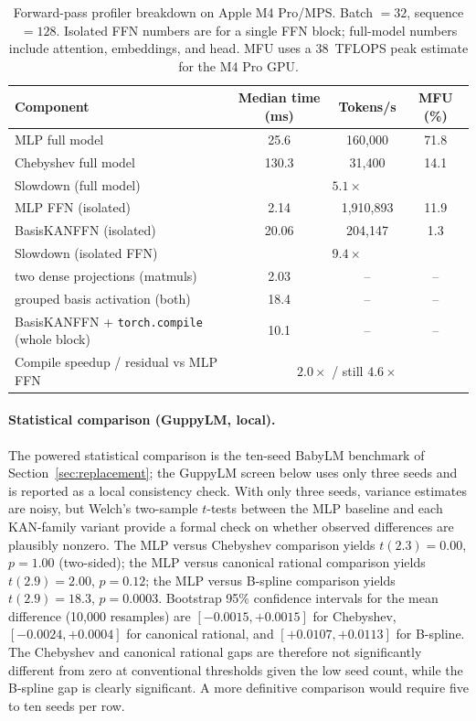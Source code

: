 \documentclass[11pt]{article}
\begin{document}
\begin{table}[t]
\centering
\caption{Forward-pass profiler breakdown on Apple M4 Pro/MPS. Batch \(=32\), sequence \(=128\). Isolated FFN numbers are for a single FFN block; full-model numbers include attention, embeddings, and head. MFU uses a \(38\)~TFLOPS peak estimate for the M4 Pro GPU.}
\label{tab:profiler}
\begin{tabular}{@{}lccc@{}}
\toprule
Component & Median time (ms) & Tokens/s & MFU (\%) \\
\midrule
MLP full model & 25.6 & 160,000 & 71.8 \\
Chebyshev full model & 130.3 & 31,400 & 14.1 \\
\quad Slowdown (full model) & \multicolumn{3}{c}{\(5.1\times\)} \\
\midrule
MLP FFN (isolated) & 2.14 & 1,910,893 & 11.9 \\
BasisKANFFN (isolated) & 20.06 & 204,147 & 1.3 \\
\quad Slowdown (isolated FFN) & \multicolumn{3}{c}{\(9.4\times\)} \\
\midrule
\quad two dense projections (matmuls) & 2.03 & -- & -- \\
\quad grouped basis activation (both) & 18.4 & -- & -- \\
\midrule
BasisKANFFN + \texttt{torch.compile} (whole block) & 10.1 & -- & -- \\
\quad Compile speedup / residual vs MLP FFN & \multicolumn{3}{c}{\(2.0\times\) / still \(4.6\times\)} \\
\bottomrule
\end{tabular}
\end{table}

\paragraph{Statistical comparison (GuppyLM, local).}
The powered statistical comparison is the ten-seed BabyLM benchmark of Section~\ref{sec:replacement}; the GuppyLM screen below uses only three seeds and is reported as a local consistency check. With only three seeds, variance estimates are noisy, but Welch's two-sample \(t\)-tests between the MLP baseline and each KAN-family variant provide a formal check on whether observed differences are plausibly nonzero. The MLP versus Chebyshev comparison yields \(t(2.3)=0.00\), \(p=1.00\) (two-sided); the MLP versus canonical rational comparison yields \(t(2.9)=2.00\), \(p=0.12\); the MLP versus B-spline comparison yields \(t(2.9)=18.3\), \(p=0.0003\). Bootstrap 95\% confidence intervals for the mean difference (10,000 resamples) are \([-0.0015,+0.0015]\) for Chebyshev, \([-0.0024,+0.0004]\) for canonical rational, and \([+0.0107,+0.0113]\) for B-spline. The Chebyshev and canonical rational gaps are therefore not significantly different from zero at conventional thresholds given the low seed count, while the B-spline gap is clearly significant. A more definitive comparison would require five to ten seeds per row.
\end{document}
